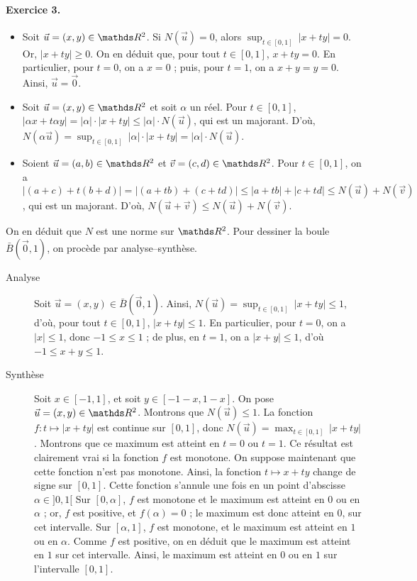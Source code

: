 \documentclass[a4paper]{article}
\begin{document}
	\paragraph{Exercice 3.}
	\begin{itemize}
		\item Soit $\vec{u} = (x,y) \in \R^2$. Si $N(\vec{u}) = 0$, alors $\sup_{t \in [0,1]}\: |x+ty| = 0$. Or, $|x+ty| \ge 0$. On en déduit que, pour tout $t\in [0,1]$, $x + ty = 0$.
			En particulier, pour $t = 0$, on a $x = 0$ ; puis, pour $t = 1$, on a $x + y = y = 0$.
			Ainsi, $\vec{u} = \vec{0}$.
		\item Soit $\vec{u} = (x,y) \in \R^2$ et soit $\alpha$ un réel. Pour $t \in [0,1]$, $|\alpha x + t \alpha y| = |\alpha| \cdot |x + ty| \le |\alpha| \cdot N(\vec{u})$, qui est un majorant. D'où, $N(\alpha \vec{u}) = \sup_{t \in [0,1]}\: |\alpha| \cdot |x+ty| = |\alpha| \cdot N(\vec{u})$.
		\item Soient $\vec{u} = (a,b) \in \R^2$ et $\vec{v} = (c,d) \in \R^2$. Pour $t \in [0,1]$, on a $|(a+c) + t(b+d)| = |(a + tb) + (c+ td)| \le |a + tb| + |c + td| \le N(\vec{u}) + N(\vec{v})$, qui est un majorant. D'où, $N(\vec{u} + \vec{v}) \le N(\vec{u}) + N(\vec{v})$.
	\end{itemize}
	On en déduit que $N$ est une norme sur $\R^2$.
	Pour dessiner la boule $\bar{B}(\vec{0}, 1)$, on procède par analyse--synthèse.
	\begin{description}
		\item[Analyse] Soit $\vec{u} = (x,y) \in \bar{B}(\vec{0}, 1)$. Ainsi, $N(\vec{u}) = \sup_{t \in [0,1]}\:|x+ty| \le 1$, d'où, pour tout $t \in [0,1]$, $|x+ty| \le 1$.
			En particulier, pour $t = 0$, on a $|x| \le 1$, donc $-1 \le x \le 1$ ; de plus, en $t = 1$, on a $|x+y| \le 1$, d'où $-1 \le x + y \le 1$.
		\item[Synthèse]
			Soit $x \in [-1,1]$, et soit $y \in [-1-x, 1-x]$.
			On pose $\vec{u} = (x,y) \in \R^2$.
			Montrons que $N(\vec{u}) \le 1$.
			La fonction $f: t \mapsto |x+ty|$ est continue sur $[0,1]$, donc $N(\vec{u}) = \max_{t \in [0,1]}\:|x+ty|$.
			Montrons que ce maximum est atteint en $t = 0$ ou $t = 1$.
			Ce résultat est clairement vrai si la fonction $f$ est monotone.
			On suppose maintenant que cette fonction n'est pas monotone.
			Ainsi, la fonction $t \mapsto x + ty$ change de signe sur $[0,1]$.
			Cette fonction s'annule une fois en un point d'abscisse $\alpha \in {]0,1[}$
			Sur $[0,\alpha]$, $f$ est monotone et le maximum est atteint en $0$ ou en $\alpha$ ;
			or, $f$ est positive, et $f(\alpha) = 0$ ; le maximum est donc atteint en $0$, sur cet intervalle.
			Sur $[\alpha,1]$, $f$ est monotone, et le maximum est atteint en $1$ ou en $\alpha$.
			Comme $f$ est positive, on en déduit que le maximum est atteint en $1$ sur cet intervalle.
			Ainsi, le maximum est atteint en $0$ ou en $1$ sur l'intervalle $[0,1]$.
	\end{description}
\end{document}
